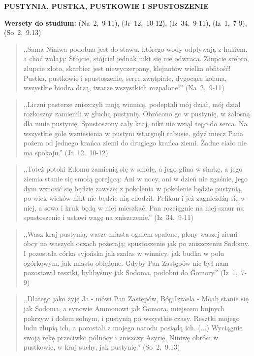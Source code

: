 \documentclass[10pt,a4paper,oneside]{article}
\begin{document}
\centerline{\textbf{\MakeUppercase{Pustynia, pustka, pustkowie i spustoszenie}}}
\begin{center}
\textbf{Wersety do studium:} \mbox{(Na 2, 9-11)}, \mbox{(Jr 12, 10-12)}, \mbox{(Iz 34, 9-11)}, \mbox{(Iz 1, 7-9)}, \mbox{(So 2, 9.13)}
\end{center}
\begin{quote}
,,Sama Niniwa podobna jest do stawu, którego wody odpływają z hukiem, a choć wołają: Stójcie, stójcie! jednak nikt się nie odwraca. Złupcie srebro, złupcie złoto, skarbiec jest niewyczerpany, klejnotów wielka obfitość! Pustka, pustkowie i spustoszenie, serce zwątpiałe, dygocące kolana, wszystkie biodra drżą, twarze wszystkich rozpalone!'' \mbox{(Na 2, 9-11)}
\end{quote}
\begin{quote}
,,Liczni pasterze zniszczyli moją winnicę, podeptali mój dział, mój dział rozkoszny zamienili w głuchą pustynię. Obrócono go w pustynię, w żałosną dla mnie pustynię. Spustoszony cały kraj, nikt nie wziął tego do serca. Na wszystkie gołe wzniesienia w pustyni wtargnęli rabusie, gdyż miecz Pana pożera od jednego krańca ziemi do drugiego krańca ziemi. Żadne ciało nie ma spokoju.'' \mbox{(Jr 12, 10-12)}
\end{quote}
\begin{quote}
,,Toteż potoki Edomu zamienią się w smołę, a jego glina w siarkę, a jego ziemia stanie się smołą gorejącą: Ani w nocy, ani w dzień nie zgaśnie, jego dym wznosić się będzie zawsze; z pokolenia w pokolenie będzie pustynią, po wiek wieków nikt nie będzie nią chodził. Pelikan i jeż zagnieżdżą się w niej, a sowa i kruk będą w niej mieszkać; Pan rozciągnie na niej sznur na spustoszenie i ustawi wagę na zniszczenie.'' \mbox{(Iz 34, 9-11)}
\end{quote}
\begin{quote}
,,Wasz kraj pustynią, wasze miasta ogniem spalone, plony waszej ziemi obcy na waszych oczach pożerają; spustoszenie jak po zniszczeniu Sodomy. I pozostała córka syjońska jak szałas w winnicy, jak budka w polu ogórkowym, jak miasto oblężone. Gdyby Pan Zastępów nie był nam pozostawił resztki, bylibyśmy jak Sodoma, podobni do Gomory.'' \mbox{(Iz 1, 7-9)}
\end{quote}
\begin{quote}
,,Dlatego jako żyję Ja - mówi Pan Zastępów, Bóg Izraela - Moab stanie się jak Sodoma, a synowie Ammonowi jak Gomora, miejscem bujnych pokrzyw i dołem solnym, i pustynią po wszystkie czasy. Resztki mojego ludu złupią ich, a pozostali z mojego narodu posiądą ich. (...) Wyciągnie swoją rękę przeciwko północy i zniszczy Asyrię, Niniwę obróci w pustkowie, w kraj suchy, jak pustynię.'' \mbox{(So 2, 9.13)}
\end{quote}
\end{document}
